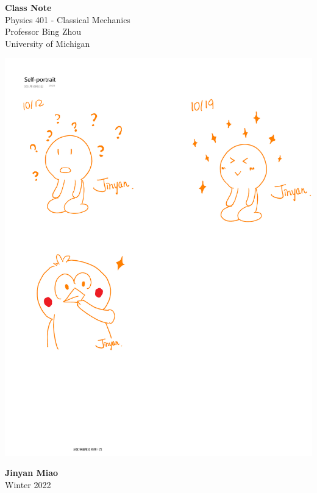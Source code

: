 \documentclass[11pt,oneside]{book}
\theoremstyle{break}
\theoremstyle{break}
\begin{document}
	\begin{titlepage}
		\begin{center}
			\vspace*{\fill}
			\Huge \color{red}
				\textbf{Class Note}\\
			\vspace{0.5cm}			
			\Large \color{black}
				Physics 401 - Classical Mechanics\\	
				Professor Bing Zhou\\
				University of Michigan\\
			\vspace{3cm}
			
			\begin{center}
			\includegraphics[scale=0.8]{hmm.pdf}
			\end{center}
			
			\vspace{3cm}
			\LARGE
				\textbf{Jinyan Miao}\\
				Winter 2022\\
			\vspace{5cm}

		\vspace*{\fill}
		\end{center}			
	\end{titlepage}
\end{document}
